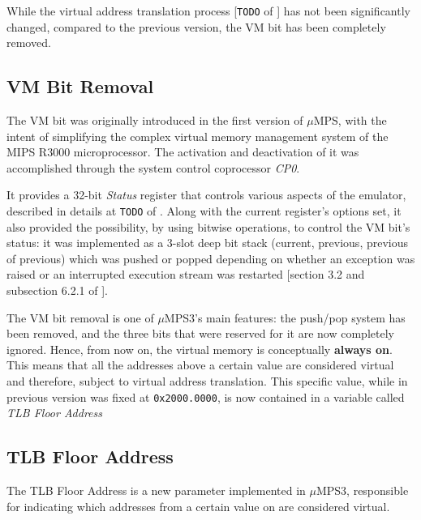 \documentclass[12pt,a4paper,openright,twoside]{report}
\begin{document}
While the virtual address translation process [\texttt{TODO} of \cite{pops}] has not been significantly changed, compared to the previous version, the VM bit has been completely removed.

\subsection{VM Bit Removal}
The VM bit was originally introduced in the first version of $\mu$MPS, with the intent of simplifying the complex virtual memory management system of the MIPS R3000 microprocessor.
The activation and deactivation of it was accomplished through the system control coprocessor \textit{CP0}.

It provides a 32-bit \textit{Status} register that controls various aspects of the emulator, described in details at \texttt{TODO} of \cite{pops}.
Along with the current register's options set, it also provided the possibility, by using bitwise operations, to control the VM bit's status: it was implemented as a 3-slot deep bit stack (current, previous, previous of previous) which was pushed or popped depending on whether an exception was raised or an interrupted execution stream was restarted [section 3.2 and subsection 6.2.1 of \cite{old_pops}].

The VM bit removal is one of $\mu$MPS3's main features: the push/pop system has been removed, and the three bits that were reserved for it are now completely ignored.
Hence, from now on, the virtual memory is conceptually \textbf{always on}.
This means that all the addresses above a certain value are considered virtual and therefore, subject to virtual address translation.
This specific value, while in previous version was fixed at \texttt{0x2000.0000}, is now contained in a variable called \textit{TLB Floor Address}

\subsection{TLB Floor Address}
\label{chap:tlb_floor_address}
The TLB Floor Address is a new parameter implemented in $\mu$MPS3, responsible for indicating which addresses from a certain value on are considered virtual.
\end{document}
